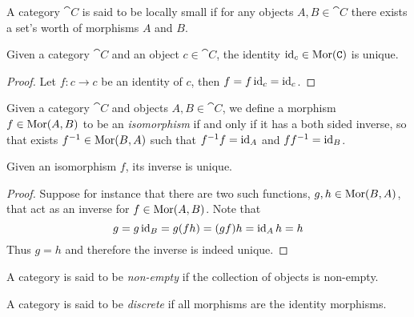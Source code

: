 \begin{definition}
    A category \(\cat C\) is said to be locally small if for any objects \(A,B \in
    \cat C\) there exists a set's worth of morphisms \(A\) and \(B\).
\end{definition}

\begin{corollary}\label{cor: unique identity}
    Given a category \(\cat C\) and an object \(c \in \cat C\), the identity \(\operatorname{id}_c
    \in \operatorname{Mor}(\texttt C)\) is unique.
\end{corollary}

\begin{proof}
    Let \(f: c \to c\) be an identity of \(c\), then \(f = f \operatorname{id}_c = \operatorname{id}_c\).
\end{proof}

\begin{definition}[Isomorphism]\label{def:isomorphism}
    Given a category \(\cat{C}\) and objects \(A, B \in \cat{C}\), we define a
    morphism \(f \in \operatorname{Mor}(A, B)\) to be an \emph{isomorphism} if and only if it has
    a both sided inverse, so that exists \(f^{-1} \in \operatorname{Mor}(B, A)\) such that
    \(f^{-1}f = \operatorname{id}_A\) and \(ff^{-1} = \operatorname{id}_B\).
\end{definition}

\begin{proposition}\label{prop: iso unique inverse}
    Given an isomorphism \(f\), its inverse is unique.
\end{proposition}

\begin{proof}
    Suppose for instance that there are two such functions, \(g, h \in \operatorname{Mor}(B, A)\),
    that act as an inverse for \(f \in \operatorname{Mor}(A, B)\). Note that
    \[
        g = g \operatorname{id}_B = g(f h) = (g f) h = \operatorname{id}_A h = h
    \]
    Thus \(g = h\) and therefore the inverse is indeed unique.
\end{proof}

\begin{definition}
    \label{def:non-empty-category}
    A category is said to be \emph{non-empty} if the collection of objects is
    non-empty.
\end{definition}

\begin{definition}
    \label{def:discrete-category}
    A category is said to be \emph{discrete} if all morphisms are the identity
    morphisms.
\end{definition}

